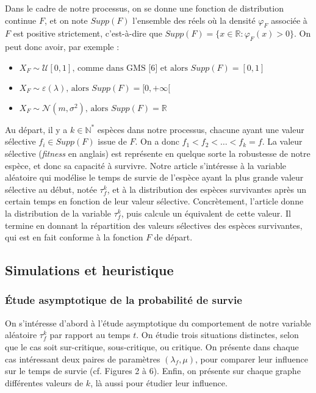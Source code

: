 \documentclass[12pt,a4paper]{article}
\begin{document}
Dans le cadre de notre processus, on se donne une fonction de distribution continue $F$, et on note $Supp(F)$ l’ensemble des réels où la densité $\varphi_F$ associée à $F$ est positive strictement, c’est-à-dire que $ Supp(F) = \{x \in \mathbb{R}: \varphi_F(x) > 0\}$. 
On peut donc avoir, par exemple : 

\begin{itemize}
    \item $X_F \sim \mathcal{U}[0,1] \text{, comme dans GMS [6] et alors } Supp(F) = [0,1]$
    \item $X_F \sim \varepsilon(\lambda) \text{, alors } Supp(F) = [0,+\infty[$
    \item $X_F \sim \mathcal{N}(m,\sigma^2) \text{, alors } Supp(F) = \mathbb{R}$
\end{itemize}


Au départ, il y a $k \in \mathbb{N}^*$ espèces dans notre processus, chacune ayant une valeur sélective $f_i \in Supp(F)$ issue de $F$. On a donc $f_1 < f_2 < … < f_k = f$. La valeur sélective (\textit{fitness} en anglais) est représente en quelque sorte la robustesse de notre espèce, et donc sa capacité à survivre. Notre article s’intéresse à la variable aléatoire qui modélise le temps de survie de l’espèce ayant la plus grande valeur sélective au début, notée $\tau_f^k$, et à la distribution des espèces survivantes après un certain temps en fonction de leur valeur sélective. Concrètement, l'article donne la distribution de la variable $\tau_f^k$, puis calcule un équivalent de cette valeur. Il termine en donnant la répartition des valeurs sélectives des espèces survivantes, qui est en fait conforme à la fonction $F$ de départ. \par


\subsection{Simulations et heuristique}
\subsubsection{Étude asymptotique de la probabilité de survie}\par
On s'intéresse d'abord à l'étude asymptotique du comportement de notre variable aléatoire $\tau_f^k$ par rapport au temps $t$. On étudie trois situations distinctes, selon que le cas soit sur-critique, sous-critique, ou critique. On présente dans chaque cas intéressant deux paires de paramètres $(\lambda_f, \mu)$, pour comparer leur influence sur le temps de survie (cf. Figures 2 à 6). Enfin, on présente  sur chaque graphe différentes valeurs de $k$, là aussi pour étudier leur influence. 
\end{document}
